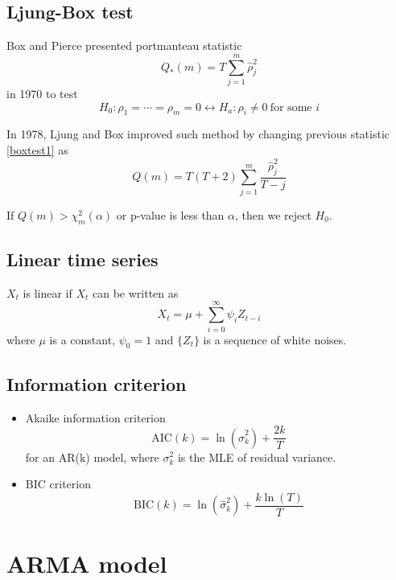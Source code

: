 \documentclass{article}
\begin{document}
\subsection{Ljung-Box test}
Box and Pierce presented portmanteau statistic
\begin{equation}\label{boxtest1}
Q_{*}(m)=T \sum_{j=1}^{m} \hat{\rho}_{j}^{2}
\end{equation}
in 1970 to test
$$
H_{0} : \rho_{1}=\cdots=\rho_{m}=0 \longleftrightarrow H_{a} : \rho_i \neq 0\ \text{for some } i 
$$

\noindent In 1978, Ljung and Box improved such method by changing previous statistic \eqref{boxtest1} as
\begin{equation*}
Q(m)=T(T+2) \sum_{j=1}^{m} \frac{\hat{\rho}_{j}^{2}}{T-j}
\end{equation*}

\noindent If $Q(m) > \chi_m^2(\alpha)$ or p-value is less than $\alpha$, then we reject $H_0$.

\subsection{Linear time series}
$X_t$ is linear if $X_t$ can be written as
\begin{equation*}
X_{t}=\mu+\sum_{i=0}^{\infty} \psi_{i} Z_{t-i}
\end{equation*}
where $\mu$ is a constant, $\psi_0 = 1$ and $\{Z_t\}$ is a sequence of white noises.

\subsection{Information criterion}
\begin{itemize}
	\item Akaike information criterion
	\begin{equation*}
	\text{AIC}(k) = \ln \left(\hat{\sigma}_{k}^{2}\right)+\frac{2 k}{T}
	\end{equation*}
	for an AR(k) model, where $\sigma_k^2$ is the MLE of residual variance.
	
	\item BIC criterion
	\begin{equation*}
	\text{BIC}(k) = \ln \left(\hat{\sigma}_{k}^{2}\right)+\frac{k \ln (T)}{T}
	\end{equation*}
\end{itemize}


\section{ARMA model}
\end{document}
